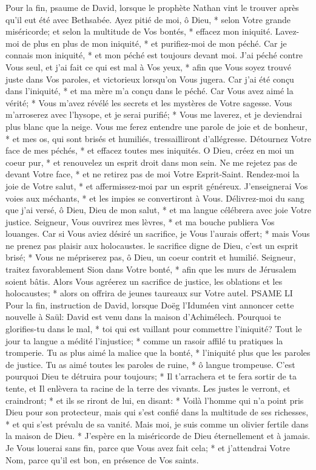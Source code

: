 Pour la fin, psaume de David,
lorsque le prophète Nathan vint le trouver après qu'il eut été avec Bethsabée.
Ayez pitié de moi, ô Dieu, * selon Votre grande miséricorde; et selon la multitude de Vos bontés, * effacez mon iniquité.
Lavez-moi de plus en plus de mon iniquité, * et purifiez-moi de mon péché.
Car je connais mon iniquité, * et mon péché est toujours devant moi.
J'ai péché contre Vous seul, et j'ai fait ce qui est mal à Vos yeux, * afin que Vous soyez trouvé juste dans Vos paroles, et victorieux lorsqu'on Vous jugera.
Car j'ai été conçu dans l'iniquité, * et ma mère m'a conçu dans le péché.
Car Vous avez aimé la vérité; * Vous m'avez révélé les secrets et les mystères de Votre sagesse.
Vous m'arroserez avec l'hysope, et je serai purifié; * Vous me laverez, et je deviendrai plus blanc que la neige.
Vous me ferez entendre une parole de joie et de bonheur, * et mes os, qui sont brisés et humiliés, tressailliront d'allégresse.
Détournez Votre face de mes péchés, * et effacez toutes mes iniquités.
O Dieu, créez en moi un coeur pur, * et renouvelez un esprit droit dans mon sein.
Ne me rejetez pas de devant Votre face, * et ne retirez pas de moi Votre Esprit-Saint.
Rendez-moi la joie de Votre salut, * et affermissez-moi par un esprit généreux.
J'enseignerai Vos voies aux méchants, * et les impies se convertiront à Vous.
Délivrez-moi du sang que j'ai versé, ô Dieu, Dieu de mon salut, * et ma langue célébrera avec joie Votre justice.
Seigneur, Vous ouvrirez mes lèvres, * et ma bouche publiera Vos louanges.
Car si Vous aviez désiré un sacrifice, je Vous l'aurais offert; * mais Vous ne prenez pas plaisir aux holocaustes.
le sacrifice digne de Dieu, c'est un esprit brisé; * Vous ne mépriserez pas, ô Dieu, un coeur contrit et humilié.
Seigneur, traitez favorablement Sion dans Votre bonté, * afin que les murs de Jérusalem soient bâtis.
Alors Vous agréerez un sacrifice de justice, les oblations et les holocaustes; * alors on offrira de jeunes taureaux sur Votre autel.
PSAME LI
Pour la fin, instruction de David,
lorsque Doëg l'Iduméen vint annoncer cette nouvelle à Saül: David est venu dans la maison d'Achimélech.
Pourquoi te glorifies-tu dans le mal, * toi qui est vaillant pour commettre l'iniquité?
Tout le jour ta langue a médité l'injustice; * comme un rasoir affilé tu pratiques la tromperie.
Tu as plus aimé la malice que la bonté, * l'iniquité plus que les paroles de justice.
Tu as aimé toutes les paroles de ruine, * ô langue trompeuse.
C'est pourquoi Dieu te détruira pour toujours; * Il t'arrachera et te fera sortir de ta tente, et Il enlèvera ta racine de la terre des vivants.
Les justes le verront, et craindront; * et ils se riront de lui, en disant: *
Voilà l'homme qui n'a point pris Dieu pour son protecteur, mais qui s'est confié dans la multitude de ses richesses, * et qui s'est prévalu de sa vanité.
Mais moi, je suis comme un olivier fertile dans la maison de Dieu. * J'espère en la miséricorde de Dieu éternellement et à jamais.
Je Vous louerai sans fin, parce que Vous avez fait cela; * et j'attendrai Votre Nom, parce qu'il est bon, en présence de Vos saints.

